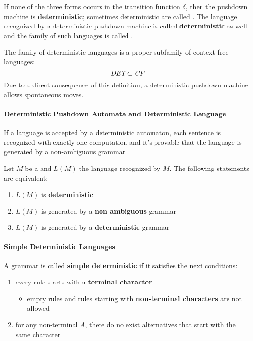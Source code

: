 \documentclass[english]{article}
\begin{document}
If none of the three forms occurs in the transition function \(\delta\), then the pushdown machine is \textbf{deterministic};
sometimes deterministic \PDA are called \DPDA.
The language recognized by a deterministic pushdown machine is called \textbf{deterministic} as well and the family of such languages is called \DET.

The family of deterministic languages is a proper subfamily of context-free languages:
\[ \textit{DET} \subset \textit{CF} \]
Due to a direct consequence of this definition, a deterministic pushdown machine allows spontaneous moves.

\paragraph{Deterministic Pushdown Automata and Deterministic Language}

If a language is accepted by a deterministic automaton, each sentence is recognized with exactly one computation and it's provable that the language is generated by a non-ambiguous grammar.

\begin{property}
  Let \(M\) be a \DPDA and \(L(M)\) the language recognized by \(M\).
  The following statements are equivalent:

  \begin{enumerate}
    \item \(L(M)\) is \textbf{deterministic}
    \item \(L(M)\) is generated by a \textbf{non ambiguous} grammar
    \item \(L(M)\) is generated by a \textbf{deterministic} grammar
  \end{enumerate}
\end{property}

\paragraph{Simple Deterministic Languages}

A grammar is called \textbf{simple deterministic} if it satisfies the next conditions:

\begin{enumerate}
  \item every rule \RP starts with a \textbf{terminal character}
        \begin{itemize}
          \item empty rules and rules starting with \textbf{non-terminal characters} are not allowed
        \end{itemize}
  \item for any non-terminal \(A\), there do no exist alternatives that start with the same character
\end{enumerate}
\end{document}
